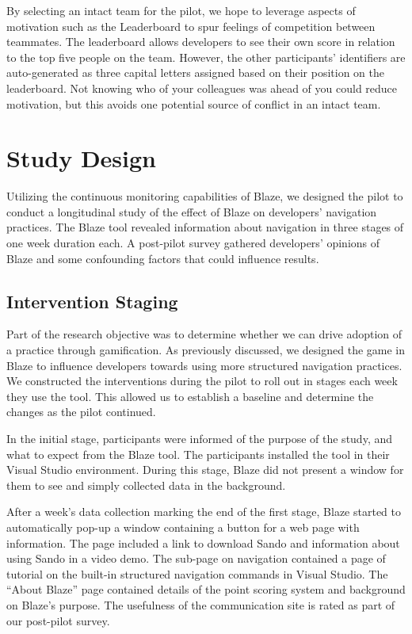 \documentclass{sig-alternate}
\begin{document}
By selecting an intact team for the pilot, we hope to leverage aspects of motivation such as the Leaderboard to spur feelings of competition between teammates.    The leaderboard allows developers to see their own score in relation to the top five people on the team.  However, the other participants' identifiers are auto-generated as three capital letters assigned based on their position on the leaderboard.  Not knowing who of your colleagues was ahead of you could reduce motivation, but this avoids one potential source of conflict in an intact team.

\section {Study Design}

Utilizing the continuous monitoring capabilities of Blaze, we designed the pilot to conduct a longitudinal study of the effect of Blaze on developers' navigation practices.  The Blaze tool revealed information about navigation in three stages of one week duration each.  A post-pilot survey gathered developers' opinions of Blaze and some confounding factors that could influence results.

\subsection{Intervention Staging}

Part of the research objective was to determine whether we can drive adoption of a practice through gamification.  As previously discussed, we designed the game in Blaze to influence developers towards using more structured navigation practices.  We constructed the interventions during the pilot to roll out in stages each week they use the tool.  This allowed us to establish a baseline and determine the changes as the pilot continued.

In the initial stage, participants were informed of the purpose of the study, and what to expect from the Blaze tool.  The participants installed the tool in their Visual Studio environment.  During this stage, Blaze did not present a window for them to see and simply collected data in the background.   

After a week's data collection marking the end of the first stage, Blaze started to automatically pop-up a window containing a button for a web page with information.  The page included a link to download Sando  and information about using Sando in a video demo.  The sub-page on navigation contained a page of tutorial on the built-in structured navigation commands in Visual Studio.  The ``About Blaze'' page contained details of the point scoring system and background on Blaze's purpose.  The usefulness of the communication site is rated as part of our post-pilot  survey.
\end{document}
